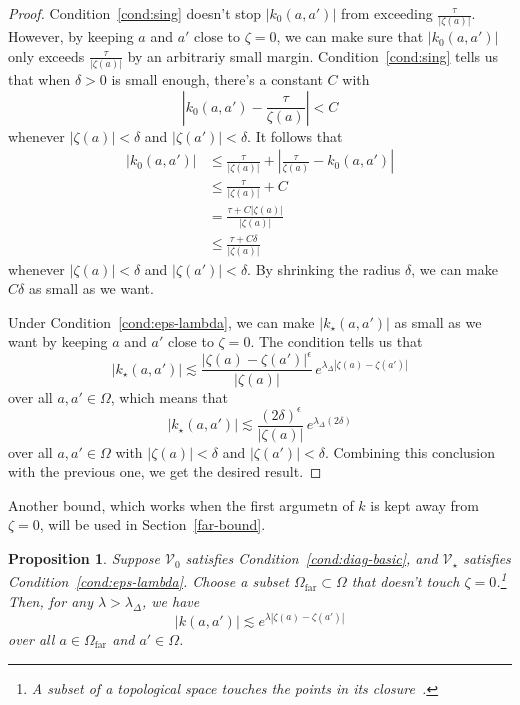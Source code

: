 \documentclass{article}
\theoremstyle{plain}
\newtheorem{prop}{Proposition}
\newcommand{\hardpart}{\mathcal{V}_0}
\newcommand{\softpart}{\mathcal{V}_\star}
\newcommand{\kerwhole}{k}
\newcommand{\hardker}{k_0}
\newcommand{\softker}{k_\star}
\newcommand{\domain}{\Omega}
\begin{document}
\begin{proof}
Condition~\eqref{cond:sing} doesn't stop $|\hardker(a, a')|$ from exceeding $\frac{\tau}{|\zeta(a)|}$. However, by keeping $a$ and $a'$ close to $\zeta = 0$, we can make sure that $|\hardker(a, a')|$ only exceeds $\frac{\tau}{|\zeta(a)|}$ by an arbitrariy small margin. Condition~\eqref{cond:sing} tells us that when $\delta > 0$ is small enough, there's a constant $C$ with
\[ \left| \hardker(a, a') - \frac{\tau}{\zeta(a)} \right| < C \]
whenever $|\zeta(a)| < \delta$ and $|\zeta(a')| < \delta$. It follows that
\begin{align*}
|\hardker(a,a')| &\leq \frac{\tau}{|\zeta(a)|}+\left\vert\frac{\tau}{\zeta(a)} - \hardker(a,a')\right\vert \\
&\leq \frac{\tau}{|\zeta(a)|} + C \\
&= \frac{\tau + C|\zeta(a)|}{|\zeta(a)|} \\
&\le \frac{\tau + C\delta}{|\zeta(a)|}
\end{align*}
whenever $|\zeta(a)| < \delta$ and $|\zeta(a')| < \delta$. By shrinking the radius $\delta$, we can make $C\delta$ as small as we want.

Under Condition~\eqref{cond:eps-lambda}, we can make $|\softker(a, a')|$ as small as we want by keeping $a$ and $a'$ close to $\zeta = 0$. The condition tells us that
\[ \big| \softker(a, a') \big| \lesssim\frac{|\zeta(a)-\zeta(a')|^\epsilon}{|\zeta(a)|}\,e^{\lambda_\Delta|\zeta(a)-\zeta(a')|}\]
over all $a, a' \in \domain$, which means that
\[ \big| \softker(a, a') \big| \lesssim\frac{(2\delta)^\epsilon}{|\zeta(a)|}\,e^{\lambda_\Delta(2\delta)}\]
over all $a, a' \in \domain$ with $|\zeta(a)| < \delta$ and $|\zeta(a')| < \delta$. Combining this conclusion with the previous one, we get the desired result.
\end{proof}
Another bound, which works when the first argumetn of $\kerwhole$ is kept away from $\zeta = 0$, will be used in Section~\ref{far-bound}.
\begin{prop}\label{prop:whole-ker-far-bound}
Suppose $\hardpart$ satisfies {\em Condition~\eqref{cond:diag-basic}}, and $\softpart$ satisfies {\em Condition~\eqref{cond:eps-lambda}}. Choose a subset $\domain_\text{far} \subset \domain$ that doesn't touch $\zeta = 0$.\footnote{A subset of a topological space {\em touches} the points in its closure~\cite[Chapter~5, Definition~2.11]{joshi1983gen-top}.} Then, for any $\lambda > \lambda_\Delta$, we have
\[ |\kerwhole(a,a')| \lesssim e^{\lambda |\zeta(a)-\zeta(a')|} \]
over all $a \in \domain_\text{far}$ and $a' \in \domain$.
\end{prop}
\end{document}
